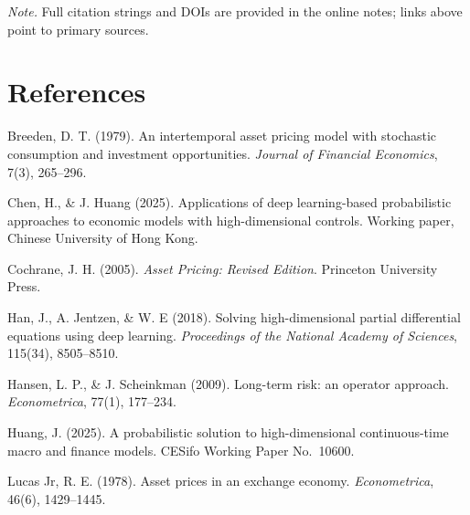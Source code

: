 ﻿\documentclass[11pt,letterpaper,oneside]{article}
\numberwithin{equation}{section}
\newcommand{\1}{\mathbf{1}}
\begin{document}
\medskip
\noindent\emph{Note.} Full citation strings and DOIs are provided in the online notes; links above point to primary sources.

\clearpage
\section*{References}
\begin{thebibliography}{99}\small
{} Breeden, D. T. (1979).
An intertemporal asset pricing model with stochastic consumption and investment opportunities.
\emph{Journal of Financial Economics}, 7(3), 265--296.

 Chen, H., \& J. Huang (2025).
Applications of deep learning-based probabilistic approaches to economic models with high-dimensional controls.
Working paper, Chinese University of Hong Kong.

 Cochrane, J. H. (2005).
\emph{Asset Pricing: Revised Edition}.
Princeton University Press.

 Han, J., A. Jentzen, \& W. E (2018).
Solving high-dimensional partial differential equations using deep learning.
\emph{Proceedings of the National Academy of Sciences}, 115(34), 8505--8510.

 Hansen, L. P., \& J. Scheinkman (2009).
Long-term risk: an operator approach.
\emph{Econometrica}, 77(1), 177--234.

 Huang, J. (2025).
A probabilistic solution to high-dimensional continuous-time macro and finance models.
CESifo Working Paper No.~10600.

 Lucas Jr, R. E. (1978).
Asset prices in an exchange economy.
\emph{Econometrica}, 46(6), 1429--1445.
\end{thebibliography}
\end{document}
